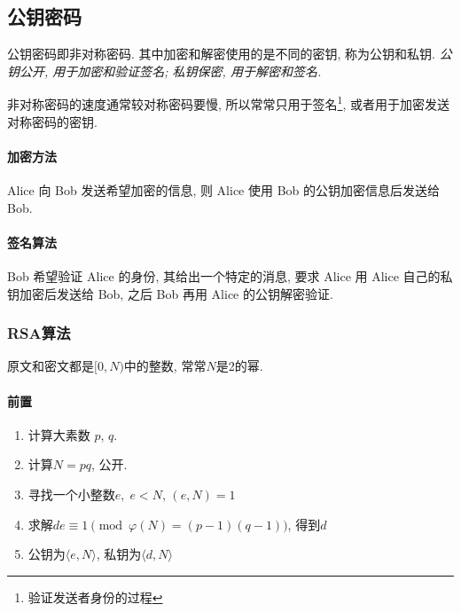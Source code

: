 \documentclass{ctexart}
\begin{document}


\clearpage
\subsection{公钥密码}
    公钥密码即非对称密码.
    其中加密和解密使用的是不同的密钥, 称为公钥和私钥.
    \emph{公钥公开, 用于加密和验证签名; 私钥保密, 用于解密和签名.}\par
    非对称密码的速度通常较对称密码要慢,
    所以常常只用于签名\footnote{验证发送者身份的过程},
    或者用于加密发送对称密码的密钥.
\paragraph{加密方法} Alice 向 Bob 发送希望加密的信息, 则 Alice 使用 Bob 的公钥加密信息后发送给 Bob.
\paragraph{签名算法} Bob 希望验证 Alice 的身份,
    其给出一个特定的消息, 要求 Alice 用 Alice 自己的私钥加密后发送给 Bob,
    之后 Bob 再用 Alice 的公钥解密验证.
\subsubsection{RSA算法}
    原文和密文都是$[0, N)$中的整数, 常常$N$是2的幂.\par
\paragraph{前置}
    \begin{enumerate}
        \item 计算大素数 $p$, $q$.
        \item 计算$N = pq$, 公开.
        \item 寻找一个小整数$e,\;e < N,\,(e, N) = 1$
        \item 求解$d e \equiv 1 \pmod{\varphi(N) = (p-1)(q-1)}$, 得到$d$
        \item 公钥为$\langle e, N \rangle$, 私钥为$\langle d, N \rangle$
    \end{enumerate}
\end{document}
